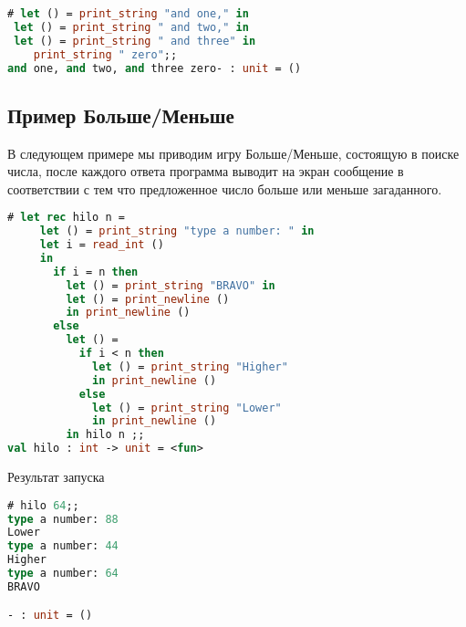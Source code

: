 \begin{lstlisting}[language=OCaml]
# let () = print_string "and one," in
 let () = print_string " and two," in
 let () = print_string " and three" in
    print_string " zero";;
and one, and two, and three zero- : unit = ()
\end{lstlisting}

\subsection{Пример Больше/Меньше}
\label{subsec:Example_Higher_Lower}

В следующем примере мы приводим игру Больше/Меньше, состоящую в поиске числа,
после каждого ответа программа выводит на экран сообщение в соответствии с тем
что предложенное число больше или меньше загаданного.

\begin{lstlisting}[language=OCaml]
# let rec hilo n =
     let () = print_string "type a number: " in
     let i = read_int ()
     in
       if i = n then
         let () = print_string "BRAVO" in
         let () = print_newline ()
         in print_newline ()
       else
         let () =
           if i < n then
             let () = print_string "Higher"
             in print_newline ()
           else
             let () = print_string "Lower"
             in print_newline ()
         in hilo n ;;
val hilo : int -> unit = <fun>
\end{lstlisting}

Результат запуска

\begin{lstlisting}[language=OCaml]
# hilo 64;;
type a number: 88
Lower
type a number: 44
Higher
type a number: 64
BRAVO

- : unit = ()
\end{lstlisting}
